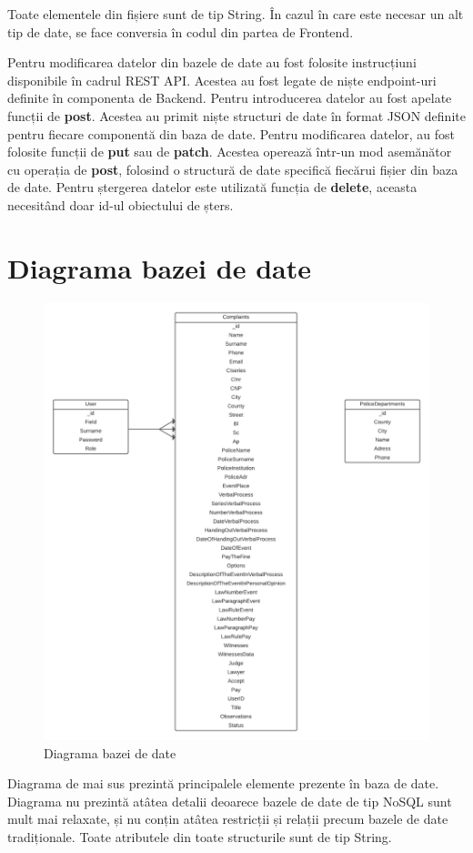 \documentclass[12pt,a4paper]{report}
\theoremstyle{definition}
\theoremstyle{remark}
\begin{document}
Toate elementele din fișiere sunt de tip String. În cazul în care este necesar un alt tip de date, se face conversia în codul din partea de Frontend.

Pentru modificarea datelor din bazele de date au fost folosite instrucțiuni disponibile în cadrul REST API. Acestea au fost legate de niște endpoint-uri definite în componenta de Backend. Pentru introducerea datelor au fost apelate funcții de \textbf{post}. Acestea au primit niște structuri de date în format JSON definite pentru fiecare componentă din baza de date. Pentru modificarea datelor, au fost folosite funcții de \textbf{put} sau de \textbf{patch}. Acestea operează într-un mod asemănător cu operația de \textbf{post}, folosind o structură de date specifică fiecărui fișier din baza de date. Pentru ștergerea datelor este utilizată funcția de \textbf{delete}, aceasta necesitând doar id-ul obiectului de șters.
\newpage
\section{Diagrama bazei de date}
\vspace{30pt}
\begin{center}
\begin{figure}[H]
    	\centering
    	\includegraphics[scale=0.6]{images/erd}
	\caption{Diagrama bazei de date}
\end{figure}
\end{center}
Diagrama de mai sus prezintă principalele elemente prezente în baza de date. Diagrama nu prezintă atâtea detalii deoarece bazele de date de tip NoSQL sunt mult mai relaxate, și nu conțin atâtea restricții și relații precum bazele de date tradiționale. Toate atributele din toate structurile sunt de tip String.
\newpage
\end{document}
